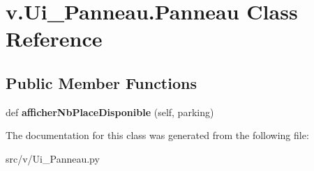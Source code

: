 \hypertarget{classv_1_1_ui___panneau_1_1_panneau}{}\section{v.\+Ui\+\_\+\+Panneau.\+Panneau Class Reference}
\label{classv_1_1_ui___panneau_1_1_panneau}
\subsection*{Public Member Functions}
\begin{DoxyCompactItemize}
\item 
\hypertarget{classv_1_1_ui___panneau_1_1_panneau_aeb93ab493a6588942a7022bafd8084ae}{}def {\bfseries afficher\+Nb\+Place\+Disponible} (self, parking)\label{classv_1_1_ui___panneau_1_1_panneau_aeb93ab493a6588942a7022bafd8084ae}

\end{DoxyCompactItemize}


The documentation for this class was generated from the following file\+:\begin{DoxyCompactItemize}
\item 
src/v/Ui\+\_\+\+Panneau.\+py\end{DoxyCompactItemize}

